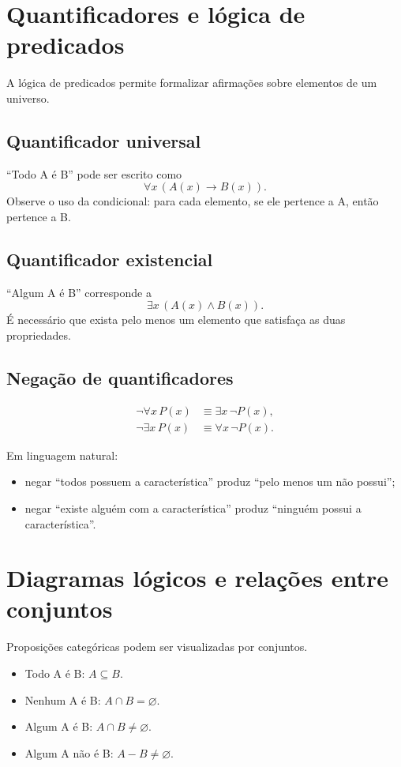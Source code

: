 \section{Quantificadores e lógica de predicados}

A lógica de predicados permite formalizar afirmações sobre elementos de um universo.

\subsection{Quantificador universal}

``Todo A é B'' pode ser escrito como
\[
\forall x\,(A(x)\to B(x)).
\]
Observe o uso da condicional: para cada elemento, se ele pertence a A, então pertence a B.

\subsection{Quantificador existencial}

``Algum A é B'' corresponde a
\[
\exists x\,(A(x)\land B(x)).
\]
É necessário que exista pelo menos um elemento que satisfaça as duas propriedades.

\subsection{Negação de quantificadores}

\begin{align*}
\neg\forall x\,P(x)&\equiv\exists x\,\neg P(x),\\
\neg\exists x\,P(x)&\equiv\forall x\,\neg P(x).
\end{align*}

Em linguagem natural:
\begin{itemize}
\item negar ``todos possuem a característica'' produz ``pelo menos um não possui'';
\item negar ``existe alguém com a característica'' produz ``ninguém possui a característica''.
\end{itemize}

\section{Diagramas lógicos e relações entre conjuntos}

Proposições categóricas podem ser visualizadas por conjuntos.

\begin{itemize}
\item Todo A é B: $A\subseteq B$.
\item Nenhum A é B: $A\cap B=\varnothing$.
\item Algum A é B: $A\cap B\neq\varnothing$.
\item Algum A não é B: $A-B\neq\varnothing$.
\end{itemize}

